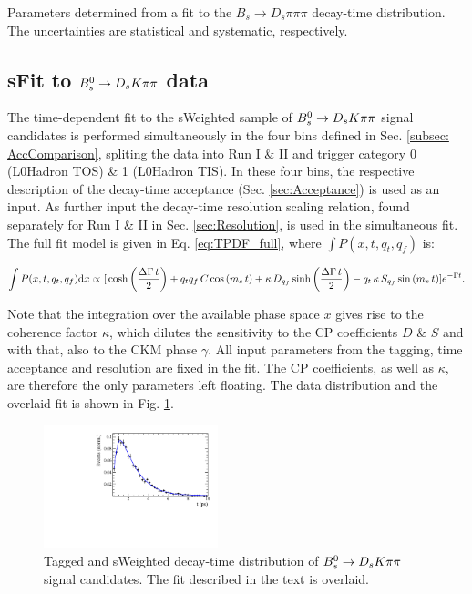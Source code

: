 \begin{table}[h]
\centering
\caption{Parameters determined from a fit to the $B_s \to D_s \pi \pi\pi$ decay-time distribution. The uncertainties are statistical and systematic, respectively.}
	\renewcommand{\arraystretch}{1.25}
	
\end{table}

\clearpage
\subsection{sFit to ${{B}^0_{s}}\rightarrow{\ensuremath{{D}_{s}}}{\ensuremath{K}}{\ensuremath{\pi}}{\ensuremath{\pi}}$ data}
The time-dependent fit to the sWeighted sample of ${{B}^0_{s}}\rightarrow{\ensuremath{{D}_{s}}}{\ensuremath{K}}{\ensuremath{\pi}}{\ensuremath{\pi}}$ signal candidates is performed simultaneously in the four bins defined in Sec. \ref{subsec: AccComparison}, 
spliting the data into Run I \& II and trigger category 0 (L0Hadron TOS) \& 1 (L0Hadron TIS). 
In these four bins, the respective description of the decay-time acceptance (Sec. \ref{sec:Acceptance}) is used as an input. 
As further input the decay-time resolution scaling relation, found separately for Run I \& II in Sec. \ref{sec:Resolution}, is used in the simultaneous fit. 
The full fit model is given in Eq. \ref{eq:TPDF_full}, where $\int P(x,t,q_t,q_f)$ is: 

\begin{equation} 
           \int P(x,t,q_t,q_f) \text d x \propto    [
        \, \text{cosh} \left( \frac{\Delta \Gamma \, t}{2}\right) 
          + q_t q_f \, C \, \text{cos} \left( m_s \, t \right)  
          + \kappa \, D_{q_f} \, \text{sinh} \left( \frac{\Delta \Gamma \, t}{2}\right)  
          - q_t \, \kappa \, S_{q_f}\, \text{sin} \left( m_s \, t \right)  ]  e^{- \Gamma t}.
\end{equation}

Note that the integration over the available phase space $x$ gives rise to the coherence factor $\kappa$, which dilutes the sensitivity to the CP coefficients $D$ \& $S$ and with that, also to the CKM phase $\gamma$. 
All input parameters from the tagging, time acceptance and resolution are fixed in the fit. The CP coefficients, as well as $\kappa$, are therefore the only parameters left floating. 
The data distribution and the overlaid fit is shown in Fig. \ref{fig:tFitSig}.

\begin{figure}[h]
	\centering
		\includegraphics[width=0.45\textwidth, height = !]{figs/timeFit/signal/h_t.pdf} 
		\caption{Tagged and sWeighted decay-time distribution of ${{B}^0_{s}}\rightarrow{\ensuremath{{D}_{s}}}{\ensuremath{K}}{\ensuremath{\pi}}{\ensuremath{\pi}}$ signal candidates. The fit described in the text is overlaid.} 
		\label{fig:tFitSig}
\end{figure}	


